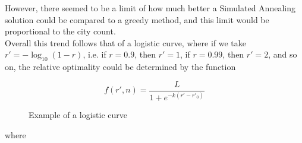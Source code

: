 \documentclass{article}
\begin{document}
However, there seemed to be a limit of how much better a Simulated Annealing solution could be compared to a greedy method, and this limit would be proportional to the city count.
\\

Overall this trend follows that of a logistic curve, where if we take $r' = -\log_{10}(1 - r)$, i.e. if $r = 0.9$, then $r' = 1$, if $r = 0.99$, then $r' = 2$, and so on, the relative optimality could be determined by the function

$$f(r', n) = \frac{L}{1 + e^{-k(r'-r'_0)}}$$

\begin{figure}[H]
    \centering
    \caption{Example of a logistic curve}
\end{figure}

where
\end{document}
